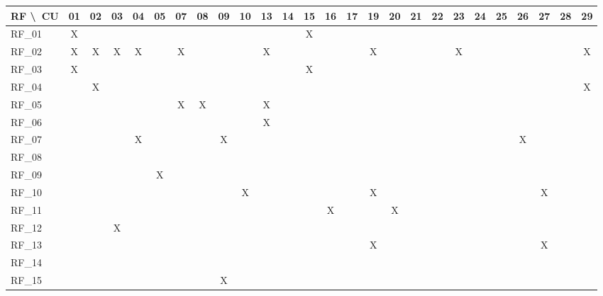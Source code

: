 \begin{landscape}
\scriptsize
\setlength{\tabcolsep}{2pt}
\renewcommand{\arraystretch}{1.1}
\begin{longtable}{|l|*{25}{c|}}
\hline
\textbf{RF \textbackslash\ CU} & \textbf{01} & \textbf{02} & \textbf{03} & \textbf{04} & \textbf{05} & \textbf{07} & \textbf{08} & \textbf{09} & \textbf{10} & \textbf{13} & \textbf{14} & \textbf{15} & \textbf{16} & \textbf{17} & \textbf{19} & \textbf{20} & \textbf{21} & \textbf{22} & \textbf{23} & \textbf{24} & \textbf{25} & \textbf{26} & \textbf{27} & \textbf{28} & \textbf{29}\\\hline
RF\_01 & X &  &  &  &  &  &  &  &  &  &  & X &  &  &  &  &  &  &  &  &  &  &  &  &  \\\hline
RF\_02 & X & X & X & X &  & X &  &  &  & X &  &  &  &  & X &  &  &  & X &  &  &  &  &  & X \\\hline
RF\_03 & X &  &  &  &  &  &  &  &  &  &  & X &  &  &  &  &  &  &  &  &  &  &  &  &  \\\hline
RF\_04 &  & X &  &  &  &  &  &  &  &  &  &  &  &  &  &  &  &  &  &  &  &  &  &  & X \\\hline
RF\_05 &  &  &  &  &  & X & X &  &  & X &  &  &  &  &  &  &  &  &  &  &  &  &  &  &  \\\hline
RF\_06 &  &  &  &  &  &  &  &  &  & X &  &  &  &  &  &  &  &  &  &  &  &  &  &  &  \\\hline
RF\_07 &  &  &  & X &  &  &  & X &  &  &  &  &  &  &  &  &  &  &  &  &  & X &  &  &  \\\hline
RF\_08 &  &  &  &  &  &  &  &  &  &  &  &  &  &  &  &  &  &  &  &  &  &  &  &  &  \\\hline
RF\_09 &  &  &  &  & X &  &  &  &  &  &  &  &  &  &  &  &  &  &  &  &  &  &  &  &  \\\hline
RF\_10 &  &  &  &  &  &  &  &  & X &  &  &  &  &  & X &  &  &  &  &  &  &  & X &  &  \\\hline
RF\_11 &  &  &  &  &  &  &  &  &  &  &  &  & X &  &  & X &  &  &  &  &  &  &  &  &  \\\hline
RF\_12 &  &  & X &  &  &  &  &  &  &  &  &  &  &  &  &  &  &  &  &  &  &  &  &  &  \\\hline
RF\_13 &  &  &  &  &  &  &  &  &  &  &  &  &  &  & X &  &  &  &  &  &  &  & X &  &  \\\hline
RF\_14 &  &  &  &  &  &  &  &  &  &  &  &  &  &  &  &  &  &  &  &  &  &  &  &  &  \\\hline
RF\_15 &  &  &  &  &  &  &  & X &  &  &  &  &  &  &  &  &  &  &  &  &  &  &  &  &  \\\hline

\end{longtable}
\end{landscape}
